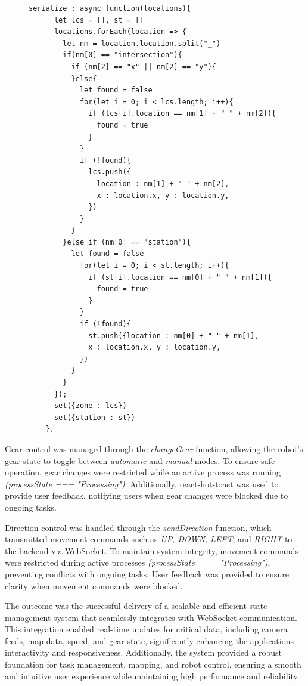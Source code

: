\documentclass[a4paper,12pt]{extreport}
\begin{document}
\begin{figure}[h!]
  \begin{verbatim}
serialize : async function(locations){
      let lcs = [], st = []
      locations.forEach(location => {
        let nm = location.location.split("_")
        if(nm[0] == "intersection"){
          if (nm[2] == "x" || nm[2] == "y"){ 
          }else{
            let found = false
            for(let i = 0; i < lcs.length; i++){
              if (lcs[i].location == nm[1] + " " + nm[2]){
                found = true
              }
            }
            if (!found){
              lcs.push({
                location : nm[1] + " " + nm[2],
                x : location.x, y : location.y,
              })
            }
          }
        }else if (nm[0] == "station"){
          let found = false
            for(let i = 0; i < st.length; i++){
              if (st[i].location == nm[0] + " " + nm[1]){
                found = true
              }
            }
            if (!found){
              st.push({location : nm[0] + " " + nm[1],
              x : location.x, y : location.y,
            })
          }
        }
      });
      set({zone : lcs})
      set({station : st})
    },
\end{verbatim}

\end{figure}
\newpage
Gear control was managed through the \emph{changeGear} function,
allowing the robot's gear state to toggle between \emph{automatic} and
\emph{manual} modes. To ensure safe operation, gear changes were
restricted while an active process was running \emph{(processState ===
"Processing")}. Additionally, react-hot-toast was used to provide user
feedback, notifying users when gear changes were blocked due to ongoing
tasks.

Direction control was handled through the \emph{sendDirection} function,
which transmitted movement commands such as \emph{UP, DOWN, LEFT}, and
\emph{RIGHT} to the backend via WebSocket. To maintain system integrity,
movement commands were restricted during active processes
\emph{(processState === "Processing")}, preventing conflicts with
ongoing tasks. User feedback was provided to ensure clarity when
movement commands were blocked.

The outcome was the successful delivery of a scalable and efficient
state management system that seamlessly integrates with WebSocket
communication. This integration enabled real-time updates for critical
data, including camera feeds, map data, speed, and gear state,
significantly enhancing the application\textquotesingle s interactivity
and responsiveness. Additionally, the system provided a robust
foundation for task management, mapping, and robot control, ensuring a
smooth and intuitive user experience while maintaining high performance
and reliability.
\end{document}
